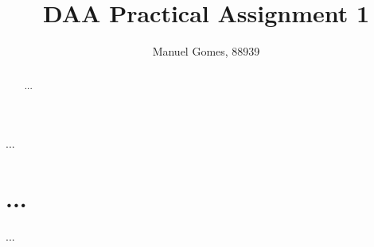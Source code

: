 \documentclass[shortpaper,english]{revdetua}
\begin{document}

\title{DAA Practical Assignment 1}
\author{Manuel Gomes, 88939} %
\maketitle

\begin{abstract}%
  ...
\end{abstract}

\begin{resumo}%
  ...
\end{resumo}



\section{...}
...

\end{document}
